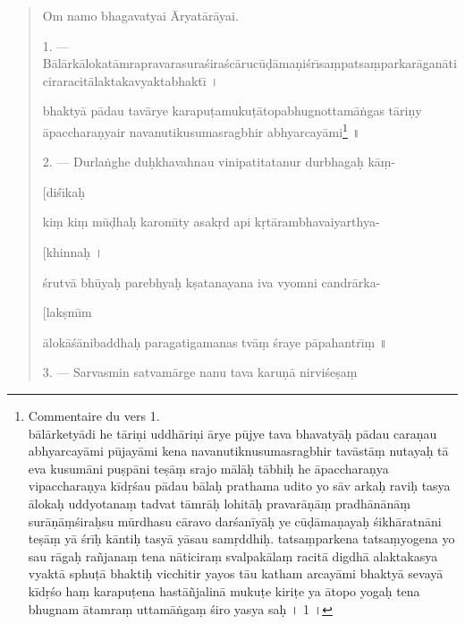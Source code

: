 \documentclass[a4paper, 11pt, oneside, french]{article}
\begin{document}
\begin{quotation}
Om namo bhagavatyai \={A}ryat\={a}r\={a}yai.

\bigskip

1. --- B\={a}l\={a}rk\={a}lokat\={a}mrapravarasura\'{s}ira\'{s}c\={a}ruc\={u}\d{d}\={a}ma\d{n}i\'{s}r\={\i}sa\d{m}patsa\d{m}parkar\={a}gan\={a}ticiraracit\={a}laktakavyaktabhakt\={\i} \texthindi{।}

bhakty\={a} p\={a}dau tav\={a}rye karapu\d{t}amuku\d{t}\={a}topabhugnottam\={a}\.{n}gas t\={a}ri\d{n}y \={a}pacchara\d{n}yair navanutikusumasragbhir abhyarcay\={a}mi\footnote{Commentaire du vers 1.\\\hspace*{5mm}bālārketyādi he tāriṇi uddhāriṇi ārye pūjye tava bhavatyāḥ pādau caraṇau abhyarcayāmi pūjayāmi kena navanutiknusumasragbhir tavāstāṃ nutayaḥ tā eva kusumāni puṣpāni teṣāṃ srajo mālāḥ tābhiḥ he āpaccharaṇya vipaccharaṇya kīdṛśau pādau bālaḥ prathama udito yo sāv arkaḥ raviḥ tasya ālokaḥ uddyotanaṃ tadvat tāmrāḥ lohitāḥ pravarāṇāṃ pradhānānāṃ surāṇāṃśiraḥsu mūrdhasu cāravo darśanīyāḥ ye cūḍāmaṇayaḥ śikhāratnāni teṣāṃ yā śrīḥ kāntiḥ tasyā yāsau samṛddhiḥ. tatsaṃparkena tatsaṃyogena yo sau rāgaḥ rañjanaṃ tena nāticiraṃ svalpakālaṃ racitā digdhā alaktakasya vyaktā sphuṭā bhaktiḥ vicchitir yayos tāu katham arcayāmi bhaktyā sevayā kīdṛśo haṃ karapuṭena hastāñjalinā mukuṭe kiriṭe ya ātopo yogaḥ tena bhugnam ātamraṃ uttamāṅgaṃ śiro yasya saḥ \texthindi{।} 1 \texthindi{।}} \texthindi{॥}

\bigskip

2. --- Durla\.{n}ghe du\d{h}khavahnau vinipatitatanur durbhaga\d{h} k\={a}\d{m}-

\hspace*{25mm}[di\'{s}\={\i}ka\d{h}

ki\d{m} ki\d{m} m\={u}\d{d}ha\d{h} karom\={\i}ty asak\d{r}d api k\d{r}t\={a}rambhavaiyarthya-

\hspace*{25mm}[khinna\d{h} \texthindi{।}

\'{s}rutv\={a} bh\={u}ya\d{h} parebhya\d{h} k\d{s}atanayana iva vyomni candr\={a}rka-

\hspace*{25mm}[lak\d{s}m\={\i}m

\={a}lok\={a}\'{s}\={a}nibaddha\d{h} paragatigamanas tv\={a}\d{m} \'{s}raye p\={a}pahantr\={\i}\d{m} \texthindi{॥}

\bigskip

3. --- Sarvasmin satvam\={a}rge nanu tava karu\d{n}\={a} nirvi\'{s}e\d{s}a\d{m}


\end{quotation}
\end{document}
